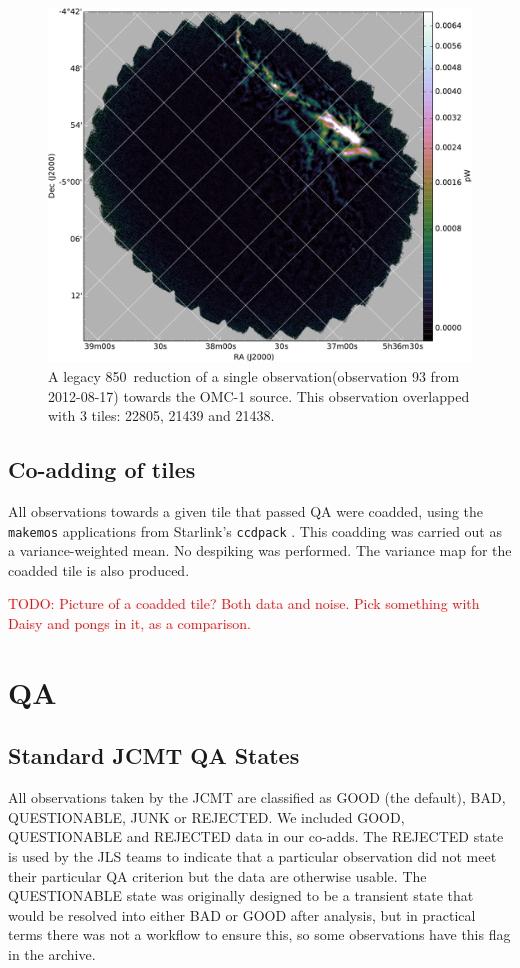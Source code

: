 \documentclass[usenatbib]{mnras}
\newcommand{\um}{\micron}
\newcommand{\todo}[1]{\textcolor{red}{TODO: #1}}
\newcommand{\ascl}[1]{\href{http://www.ascl.net/#1}{ascl:#1}}
\newcommand{\status}[1]{\textsf{#1}}
\begin{document}
\begin{figure}
  \centering
  \includegraphics[width=0.6\linewidth]{omc1_example_legacy}
  \caption{A legacy 850\,\um{} reduction of a single
    observation(observation 93 from 2012-08-17) towards the OMC-1
    source. This observation overlapped with 3 tiles: 22805, 21439 and
    21438. }
  \label{fig:omc1-example}
    \end{figure}


\subsection{Co-adding of tiles}
All observations towards a given tile that passed QA were coadded,
using the \texttt{makemos} applications from Starlink's
\texttt{ccdpack} \citep[][\ascl{1403.021}]{SUN139}. This coadding was
carried out as a variance-weighted mean. No despiking was
performed. The variance map for the coadded tile is also produced.

\todo{Picture of a coadded tile? Both data and noise. Pick something with Daisy and pongs in it, as a comparison.}




\section{QA}
\label{sec:QA}
\subsection{Standard JCMT QA States}
All observations taken by the JCMT are classified as \status{GOOD}
(the default), \status{BAD}, \status{QUESTIONABLE}, \status{JUNK} or
\status{REJECTED}. We included \status{GOOD}, \status{QUESTIONABLE}
and \status{REJECTED} data in our co-adds. The \status{REJECTED} state
is used by the JLS teams to indicate that a particular observation did
not meet their particular QA criterion but the data are otherwise
usable. The \status{QUESTIONABLE} state was originally designed to be
a transient state that would be resolved into either \status{BAD} or
\status{GOOD} after analysis, but in practical terms there was not a
workflow to ensure this, so some observations have this flag in the
archive.
\end{document}
